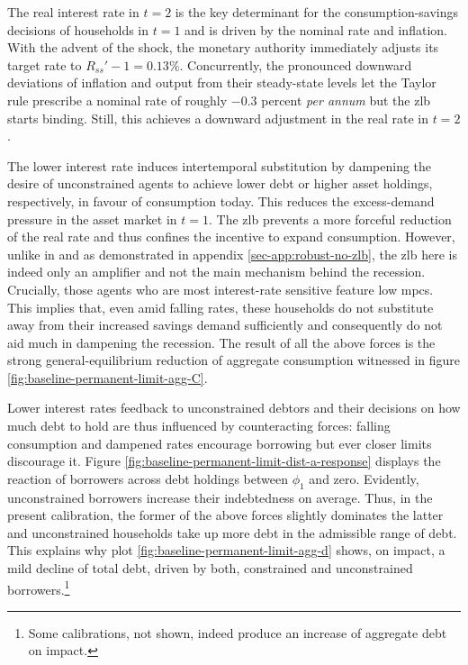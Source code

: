 \documentclass[a4paper,12pt]{article} %
\numberwithin{equation}{section} %
\numberwithin{figure}{section}
\numberwithin{table}{section}
\begin{document}
The real interest rate in $t=2$ is the key determinant for the consumption-savings decisions of households in $t=1$ and is driven by the nominal rate and inflation. With the advent of the shock, the monetary authority immediately adjusts its target rate to $R_{ss}' - 1 = 0.13\%$. Concurrently, the pronounced downward deviations of inflation and output from their steady-state levels let the Taylor rule prescribe a nominal rate of roughly $-0.3$ percent \textit{per annum} but the \Gls{zlb} starts binding. Still, this achieves a downward adjustment in the real rate in $t=2$. 

The lower interest rate induces intertemporal substitution by dampening the desire of unconstrained agents to achieve lower debt or higher asset holdings, respectively, in favour of consumption today. This reduces the excess-demand pressure in the asset market in $t=1$. The \Gls{zlb} prevents a more forceful reduction of the real rate and thus confines the incentive to expand consumption. However, unlike in \textcite{egg2012} and as demonstrated in appendix \ref{sec-app:robust-no-zlb}, the \Gls{zlb} here is indeed only an amplifier and not the main mechanism behind the recession. Crucially, those agents who are most interest-rate sensitive feature low \Gls{mpc}s. This implies that, even amid falling rates, these households do not substitute away from their increased savings demand sufficiently and consequently do not aid much in dampening the recession. The result of all the above forces is the strong general-equilibrium reduction of aggregate consumption witnessed in figure \ref{fig:baseline-permanent-limit-agg-C}.

Lower interest rates feedback to unconstrained debtors and their decisions on how much debt to hold are thus influenced by counteracting forces: falling consumption and dampened rates encourage borrowing but ever closer limits discourage it. Figure \ref{fig:baseline-permanent-limit-dist-a-response} displays the reaction of borrowers across debt holdings between $\phi_1$ and zero. Evidently, unconstrained borrowers increase their indebtedness on average. Thus, in the present calibration, the former of the above forces slightly dominates the latter and unconstrained households take up more debt in the admissible range of debt. This explains why plot \ref{fig:baseline-permanent-limit-agg-d} shows, on impact, a mild decline of total debt, driven by both, constrained and unconstrained borrowers.\footnote{Some calibrations, not shown, indeed produce an increase of aggregate debt on impact.}
\end{document}
